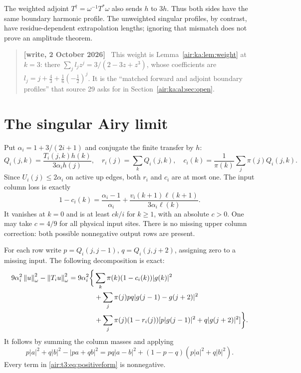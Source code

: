 \documentclass[11pt,letterpaper]{article}
\numberwithin{equation}{section}
\theoremstyle{remark}
\newcommand{\norm}[1]{\left\lVert#1\right\rVert}
\newenvironment{writenote}{\par\smallskip\begin{quote}\small\textbf{[write, 2 October 2026]}\ }{\end{quote}\smallskip}
\begin{document}
The weighted adjoint $T^\dagger=\omega^{-1}T^*\omega$ also sends $h$ to $3h$. Thus both sides have the same boundary harmonic profile. The unweighted singular profiles, by contrast, have residue-dependent extrapolation lengths; ignoring that mismatch does not prove an amplitude theorem.
\begin{writenote}
This weight is Lemma~\ref{air:ka:lem:weight} at $k=3$: there $\sum_jl_jz^j=3/(2-3z+z^3)$, whose coefficients are $l_j=j+\frac43+\frac16(-\frac12)^j$. It is the ``matched forward and adjoint boundary profiles'' that source 29 asks for in Section~\ref{air:ka:al:sec:open}.
\end{writenote}


\section{The singular Airy limit}
Put $\alpha_i=1+3/(2i+1)$ and conjugate the finite transfer by $h$:
\[
Q_i(j,k)=\frac{T_i(j,k)h(k)}{3\alpha_i h(j)},\quad
r_i(j)=\sum_kQ_i(j,k),\quad
c_i(k)=\frac{1}{\pi(k)}\sum_j\pi(j)Q_i(j,k).
\]
Since $U_i(j)\le2\alpha_i$ on active up edges, both $r_i$ and $c_i$ are at most one. The input column loss is exactly
\begin{equation}\label{air:t3:eq:column-loss}
1-c_i(k)=\frac{\alpha_i-1}{\alpha_i}
+\frac{v_i(k+1)\ell(k+1)}{3\alpha_i\ell(k)}.
\end{equation}
It vanishes at $k=0$ and is at least $c k/i$ for $k\ge1$, with an absolute $c>0$. One may take $c=4/9$ for all physical input sites. There is no missing upper column correction: both possible nonnegative output rows are present.

For each row write $p=Q_i(j,j-1)$, $q=Q_i(j,j+2)$, assigning zero to a missing input. The following decomposition is exact:
\begin{align}
9\alpha_i^2\norm{u}_\omega^2-\norm{T_i u}_\omega^2
=9\alpha_i^2\bigg\{&\sum_k\pi(k)(1-c_i(k))|g(k)|^2\notag\\
&+\sum_j\pi(j)pq|g(j-1)-g(j+2)|^2\label{air:t3:eq:positiveform}\\
&+\sum_j\pi(j)(1-r_i(j))
[p|g(j-1)|^2+q|g(j+2)|^2]\bigg\}.\notag
\end{align}
It follows by summing the column masses and applying
\[
p|a|^2+q|b|^2-|pa+qb|^2
=pq|a-b|^2+(1-p-q)(p|a|^2+q|b|^2).
\]
Every term in \eqref{air:t3:eq:positiveform} is nonnegative.
\end{document}
